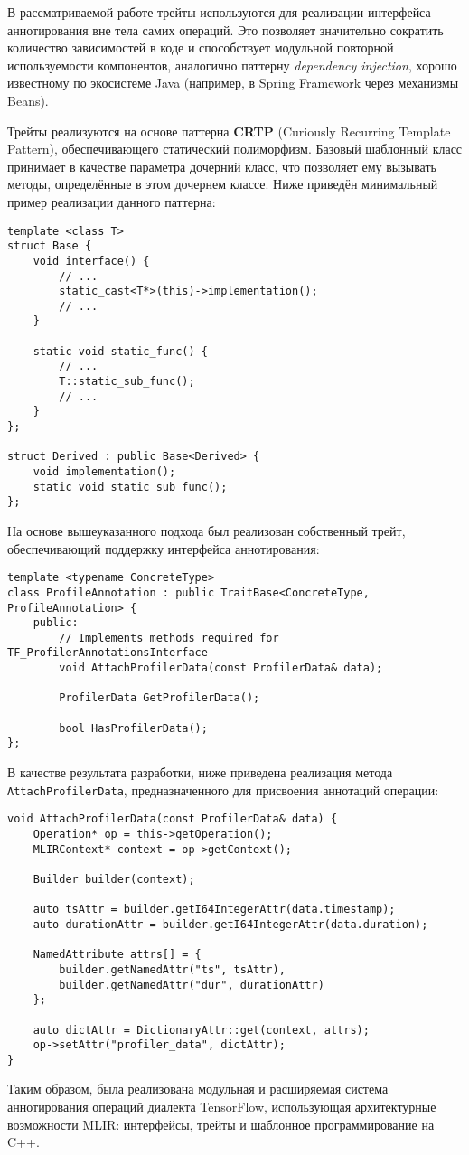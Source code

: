 В рассматриваемой работе трейты используются для реализации интерфейса аннотирования вне тела самих операций. Это позволяет значительно сократить количество зависимостей в коде и способствует модульной повторной используемости компонентов, аналогично паттерну \textit{dependency injection}, хорошо известному по экосистеме Java (например, в Spring Framework через механизмы Beans).

Трейты реализуются на основе паттерна \textbf{CRTP} (Curiously Recurring Template Pattern), обеспечивающего статический полиморфизм. Базовый шаблонный класс принимает в качестве параметра дочерний класс, что позволяет ему вызывать методы, определённые в этом дочернем классе. Ниже приведён минимальный пример реализации данного паттерна:

\begin{lstlisting}[caption={Демонстрация принципа CRTP}]
template <class T>
struct Base {
    void interface() {
        // ...
        static_cast<T*>(this)->implementation();
        // ...
    }

    static void static_func() {
        // ...
        T::static_sub_func();
        // ...
    }
};

struct Derived : public Base<Derived> {
    void implementation();
    static void static_sub_func();
};
\end{lstlisting}

На основе вышеуказанного подхода был реализован собственный трейт, обеспечивающий поддержку интерфейса аннотирования:

\begin{lstlisting}[caption={Трейт аннотирования операций MLIR}]
template <typename ConcreteType>
class ProfileAnnotation : public TraitBase<ConcreteType, ProfileAnnotation> {
    public:
        // Implements methods required for TF_ProfilerAnnotationsInterface
        void AttachProfilerData(const ProfilerData& data);

        ProfilerData GetProfilerData();

        bool HasProfilerData();
};
\end{lstlisting}

В качестве результата разработки, ниже приведена реализация метода \texttt{AttachProfilerData}, предназначенного для присвоения аннотаций операции:

\begin{lstlisting}[caption={Реализация метода AttachProfilerData}]
void AttachProfilerData(const ProfilerData& data) {
    Operation* op = this->getOperation();
    MLIRContext* context = op->getContext();

    Builder builder(context);

    auto tsAttr = builder.getI64IntegerAttr(data.timestamp);
    auto durationAttr = builder.getI64IntegerAttr(data.duration);

    NamedAttribute attrs[] = {
        builder.getNamedAttr("ts", tsAttr),
        builder.getNamedAttr("dur", durationAttr)
    };

    auto dictAttr = DictionaryAttr::get(context, attrs);
    op->setAttr("profiler_data", dictAttr);
}
\end{lstlisting}

Таким образом, была реализована модульная и расширяемая система аннотирования операций диалекта TensorFlow, использующая архитектурные возможности MLIR: интерфейсы, трейты и шаблонное программирование на C++.

\newpage
